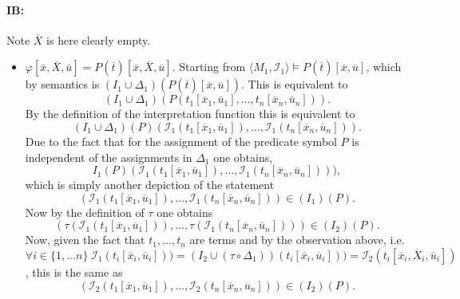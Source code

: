\documentclass[11pt,a4paper]{article}
\begin{document}
\paragraph*{IB:}
Note $\overline{X}$ is here clearly empty.
\begin{itemize}[leftmargin=*]
\item $\varphi[\overline{x}, \overline{X},\overline{u}]= P(\overline{t})[\overline{x}, \overline{X}, \overline{u}]$. Starting from $\langle M_1, \mathcal{I}_1 \rangle \models P(\overline{t})[\overline{x},  \overline{u}] $, which by semantics is $(I_1 \cup \Delta_1)(P(\overline{t})[\overline{x}, \overline{u}])$. This is equivalent to 
\begin{equation*}
(I_1 \cup \Delta_1)(P(t_1[\overline{x}_1, \overline{u}_1], \dots , t_n[\overline{x}_n,  \overline{u}_n])).
\end{equation*}
By the definition of the interpretation function this is equivalent to 
\begin{equation*}
(I_1 \cup \Delta_1)(P)(\mathcal{I}_1(t_1[\overline{x}_1,  \overline{u}_1]), \dots , \mathcal{I}_1(t_n[\overline{x}_n, \overline{u}_n])).
\end{equation*}
Due to the fact that for the assignment of the predicate symbol $P$ is independent of the assignments in $\Delta_1$ one obtains,
\begin{equation*}
I_1(P)(\mathcal{I}_1(t_1[\overline{x}_1, \overline{u}_1]), \dots , \mathcal{I}_1(t_n[\overline{x}_n,  \overline{u}_n]))),
\end{equation*}
which is simply another depiction of the statement
\begin{equation*}
(\mathcal{I}_1(t_1[\overline{x}_1, \overline{u}_1]), \dots , \mathcal{I}_1(t_n[\overline{x}_n,  \overline{u}_n])) \in (I_1)(P).
\end{equation*}
Now by the definition of $\tau$ one obtains 
\begin{equation*}
(\tau(\mathcal{I}_1(t_1[\overline{x}_1, \overline{u}_1])), \dots , \tau(\mathcal{I}_1(t_n[\overline{x}_n,  \overline{u}_n]))) \in (I_2)(P).
\end{equation*}
Now, given the fact that $t_1, \dots , t_n$ are terms and by the observation above, i.e. $\forall i \in \{1,\dots n\}\; \mathcal{I}_1(t_i[\overline{x}_i,  \overline{u}_i])) = (I_2 \cup (\tau \circ \Delta_1))(t_i[\overline{x}_i, \overline{u}_i])) = \mathcal{I}_2(t_i[\overline{x}_i, \overline{X}_i, \overline{u}_i])$, this is the same as 
\begin{equation*}
(\mathcal{I}_2(t_1[\overline{x}_1, \overline{u}_1]), \dots , \mathcal{I}_2(t_n[\overline{x}_n,  \overline{u}_n])) \in (I_2)(P).

\end{equation*}
\end{itemize}
\end{document}
